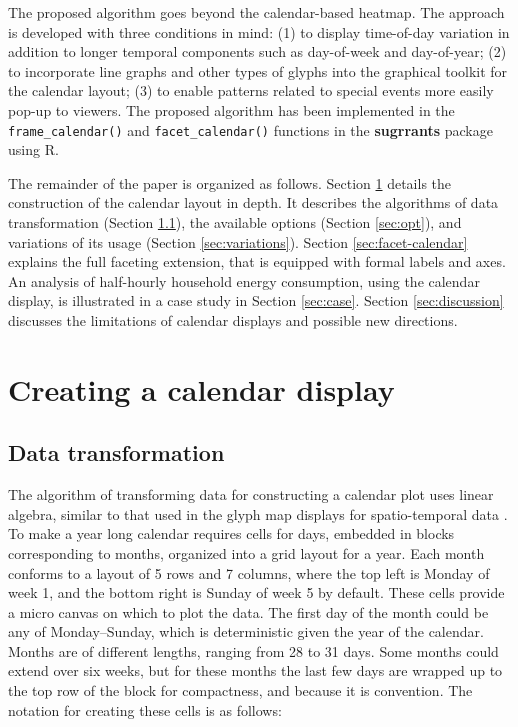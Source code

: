 \documentclass[12pt]{article}
\begin{document}
The proposed algorithm goes beyond the calendar-based heatmap. The approach is developed with three conditions in mind: (1) to display time-of-day variation in addition to longer temporal components such as day-of-week and day-of-year; (2) to incorporate line graphs and other types of glyphs into the graphical toolkit for the calendar layout; (3) to enable patterns related to special events more easily pop-up to viewers. The proposed algorithm has been implemented in the \texttt{frame\_calendar()} and \texttt{facet\_calendar()} functions in the \textbf{sugrrants} package using R.

The remainder of the paper is organized as follows. Section \ref{sec:algorithm} details the construction of the calendar layout in depth. It describes the algorithms of data transformation (Section \ref{sec:transformation}), the available options (Section \ref{sec:opt}), and variations of its usage (Section \ref{sec:variations}). Section \ref{sec:facet-calendar} explains the full faceting extension, that is equipped with formal labels and axes. An analysis of half-hourly household energy consumption, using the calendar display, is illustrated in a case study in Section \ref{sec:case}. Section \ref{sec:discussion} discusses the limitations of calendar displays and possible new directions.

\hypertarget{sec:algorithm}{%
\section{Creating a calendar display}\label{sec:algorithm}}

\hypertarget{sec:transformation}{%
\subsection{Data transformation}\label{sec:transformation}}

The algorithm of transforming data for constructing a calendar plot uses linear algebra, similar to that used in the glyph map displays for spatio-temporal data \citep{Wickham2012glyph}. To make a year long calendar requires cells for days, embedded in blocks corresponding to months, organized into a grid layout for a year. Each month conforms to a layout of 5 rows and 7 columns, where the top left is Monday of week 1, and the bottom right is Sunday of week 5 by default. These cells provide a micro canvas on which to plot the data. The first day of the month could be any of Monday--Sunday, which is deterministic given the year of the calendar. Months are of different lengths, ranging from 28 to 31 days. Some months could extend over six weeks, but for these months the last few days are wrapped up to the top row of the block for compactness, and because it is convention. The notation for creating these cells is as follows:
\end{document}
